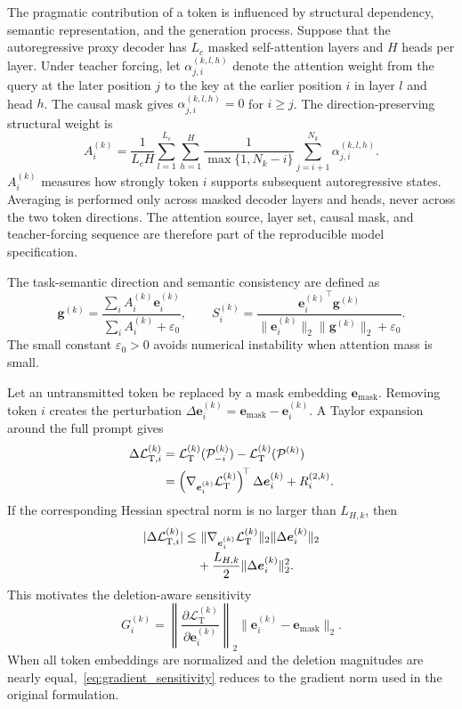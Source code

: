 \documentclass[journal]{IEEEtran}
\begin{document}
The pragmatic contribution of a token is influenced by structural dependency, semantic representation, and the generation process. Suppose that the autoregressive proxy decoder has $L_c$ masked self-attention layers and $H$ heads per layer. Under teacher forcing, let $\alpha_{j,i}^{(k,l,h)}$ denote the attention weight from the query at the later position $j$ to the key at the earlier position $i$ in layer $l$ and head $h$. The causal mask gives $\alpha_{j,i}^{(k,l,h)}=0$ for $i\geq j$. The direction-preserving structural weight is
\begin{equation}
A_i^{(k)}
=\frac{1}{L_cH}\sum_{l=1}^{L_c}\sum_{h=1}^{H}
\frac{1}{\max\{1,N_k-i\}}
\sum_{j=i+1}^{N_k}\alpha_{j,i}^{(k,l,h)}.
\label{eq:attn}
\end{equation}
$A_i^{(k)}$ measures how strongly token $i$ supports subsequent autoregressive states. Averaging is performed only across masked decoder layers and heads, never across the two token directions. The attention source, layer set, causal mask, and teacher-forcing sequence are therefore part of the reproducible model specification.

The task-semantic direction and semantic consistency are defined as
\begin{equation}
\bm g^{(k)}
=\frac{\sum_iA_i^{(k)}\bm e_i^{(k)}}{\sum_iA_i^{(k)}+\varepsilon_0},
\qquad
S_i^{(k)}
=\frac{{\bm e_i^{(k)}}^{\!\top}\bm g^{(k)}}
{\|\bm e_i^{(k)}\|_2\|\bm g^{(k)}\|_2+\varepsilon_0}.
\label{eq:semantic_consistency}
\end{equation}
The small constant $\varepsilon_0>0$ avoids numerical instability when attention mass is small.

Let an untransmitted token be replaced by a mask embedding $\bm e_{\mathrm{mask}}$. Removing token $i$ creates the perturbation $\Delta\bm e_i^{(k)}=\bm e_{\mathrm{mask}}-\bm e_i^{(k)}$. A Taylor expansion around the full prompt gives
\begin{align}
\Delta\mathcal L_{\mathrm T,i}^{(k)}
&=\mathcal L_{\mathrm T}^{(k)}(\mathcal P_{-i}^{(k)})
-\mathcal L_{\mathrm T}^{(k)}(\mathcal P^{(k)})
\notag\\
&=\left(\nabla_{\bm e_i^{(k)}}\mathcal L_{\mathrm T}^{(k)}\right)^{\!\top}
\Delta\bm e_i^{(k)}+R_i^{(2,k)}.
\label{eq:token_taylor}
\end{align}
If the corresponding Hessian spectral norm is no larger than $L_{H,k}$, then
\begin{align}
|\Delta\mathcal L_{\mathrm T,i}^{(k)}|
\leq&~
\|\nabla_{\bm e_i^{(k)}}\mathcal L_{\mathrm T}^{(k)}\|_2
\|\Delta\bm e_i^{(k)}\|_2
\notag\\[-0.1em]
&+\frac{L_{H,k}}{2}\|\Delta\bm e_i^{(k)}\|_2^2.
\label{eq:token_taylor_bound}
\end{align}
This motivates the deletion-aware sensitivity
\begin{equation}
G_i^{(k)}
=\left\|\frac{\partial\mathcal L_{\mathrm T}^{(k)}}
{\partial\bm e_i^{(k)}}\right\|_2
\|\bm e_i^{(k)}-\bm e_{\mathrm{mask}}\|_2.
\label{eq:gradient_sensitivity}
\end{equation}
When all token embeddings are normalized and the deletion magnitudes are nearly equal,~\eqref{eq:gradient_sensitivity} reduces to the gradient norm used in the original formulation.
\end{document}
